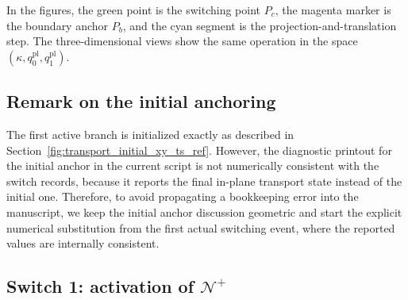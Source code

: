 \documentclass[11pt,a4paper]{article}
\begin{document}
In the figures, the green point is the switching point \(P_c\), the magenta marker is the boundary anchor \(P_b\), and the cyan segment is the projection-and-translation step. The three-dimensional views show the same operation in the space \((\kappa,q^{\mathrm{pl}}_0,q^{\mathrm{pl}}_1)\).

\subsection{Remark on the initial anchoring}

The first active branch is initialized exactly as described in Section~\ref{fig:transport_initial_xy_ts_ref}. However, the diagnostic printout for the initial anchor in the current script is not numerically consistent with the switch records, because it reports the final in-plane transport state instead of the initial one. Therefore, to avoid propagating a bookkeeping error into the manuscript, we keep the initial anchor discussion geometric and start the explicit numerical substitution from the first actual switching event, where the reported values are internally consistent.

\subsection{Switch 1: activation of \texorpdfstring{$\mathcal{N}^{+}$}{N+}}
\end{document}
